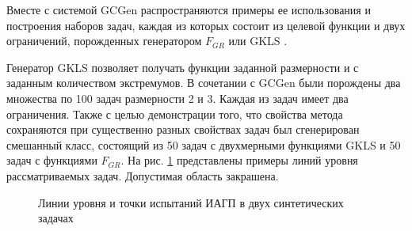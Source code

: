 Вместе с системой GCGen распространяются примеры ее использования и построения
наборов задач, каждая из которых состоит из целевой функции и двух ограничений,
порожденных генератором \(F_{GR}\) \cite{grishaginClass} или GKLS \cite{Gaviano2003}.


Генератор GKLS \cite{Gaviano2003} позволяет получать функции заданной размерности и с заданным количеством экстремумов.
В сочетании с GCGen были порождены два множества по 100 задач размерности 2 и 3. Каждая из задач имеет два ограничения.
Также с целью демонстрации того, что свойства метода сохраняются при существенно разных свойствах задач
был сгенерирован смешанный класс, состоящий из 50 задач с двухмерными функциями GKLS и 50 задач с функциями \(F_{GR}\).
На рис. \ref{fig:isolines} представлены примеры линий уровня рассматриваемых задач. Допустимая область закрашена.

\begin{figure}[ht]
    \centering
    \caption{Линии уровня и точки испытаний ИАГП в двух синтетических задачах}
    \label{fig:isolines}
\end{figure}

